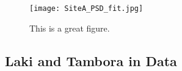 \documentclass[../../CompleteThesis/Complete_1stDraft.tex]{subfiles}
\begin{document}
\begin{figure}
	\centering
	\texttt{[image: SiteA\_PSD\_fit.jpg]}
	\caption{This is a great figure.}
	\label{Fig:d18O_ECM_Example}
\end{figure}
\subsection[Laki and Tambora][Laki and Tambora]{Laki and Tambora in Data}
\label{Subsec:Ice_VolcanicHorizons_LakiTambora}
\end{document}
